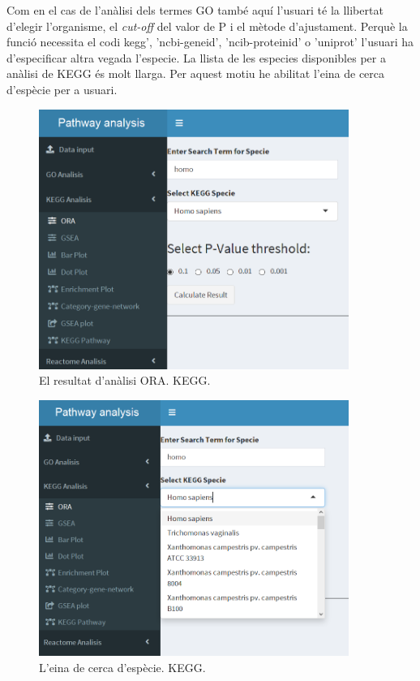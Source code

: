 \documentclass[]{article}
\begin{document}
Com en el cas de l'anàlisi dels termes GO també aquí l'usuari té la llibertat d'elegir  l'organisme, el \textit{cut-off} del valor de P i el mètode d'ajustament. Perquè la funció necessita el codi kegg', 'ncbi-geneid', 'ncib-proteinid' o 'uniprot' l'usuari ha d'especificar altra vegada l'especie. La llista de les especies disponibles per a anàlisi de KEGG és molt llarga. Per aquest motiu he abilitat l'eina de cerca d'espècie per a usuari.

\begin{figure}[H]
\centering
\includegraphics[width=0.9\textwidth]{App_F7_Items_KEGG_ORA.png}  
\caption{El resultat d'anàlisi ORA. KEGG.}
\end{figure}

\begin{figure}[H]
\centering
\includegraphics[width=0.9\textwidth]{App_F8_Items_KEGG_ORA_Search.png}  
\caption{L'eina de cerca d'espècie. KEGG.}
\end{figure}
\end{document}
